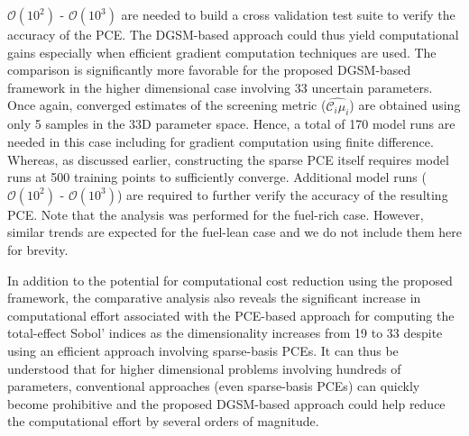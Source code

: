 {$\mathcal{O}(10^{2})$ - $\mathcal{O}(10^{3})$ are needed to build a cross validation test suite to verify the 
accuracy of the PCE. The DGSM-based approach could thus yield computational gains especially when 
efficient gradient computation techniques are used. The comparison is significantly more favorable for the 
proposed DGSM-based framework in the higher dimensional case involving 33 uncertain parameters. 
Once again, converged estimates of the screening metric ($\widehat{\mathcal{C}_i\mu_i}$) are obtained
using only 5 samples in the 33D parameter space. Hence, a total of 170 model runs are needed in this case
including for gradient computation using finite difference. Whereas, as discussed earlier,
constructing the sparse PCE itself requires model runs at 500 training points to sufficiently converge. Additional
model runs ($\mathcal{O}(10^{2})$ - $\mathcal{O}(10^{3})$) are required to further verify the accuracy of the 
resulting PCE. Note that the analysis was performed
for the fuel-rich case. However, similar trends are expected for the fuel-lean case and we do not include them here
for brevity. 

In addition to the potential for computational cost reduction using the proposed framework, the comparative 
analysis also reveals the significant increase in computational effort associated with the PCE-based approach for
computing  the total-effect
Sobol' indices as the dimensionality increases from 19 to 33 despite using an efficient approach involving
sparse-basis PCEs. It can thus be understood that for higher dimensional problems involving hundreds of 
parameters, conventional approaches (even sparse-basis PCEs) can quickly become prohibitive and
the proposed DGSM-based approach could help
reduce the computational effort by several orders of magnitude. 




}
